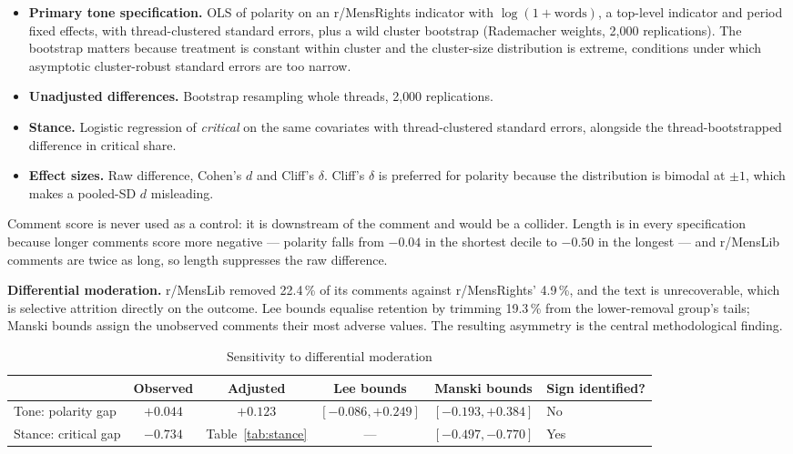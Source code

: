 \documentclass[11pt,a4paper]{article}
\begin{document}
\begin{itemize}
\item \textbf{Primary tone specification.} OLS of polarity on an r/MensRights indicator with
$\log(1+\text{words})$, a top-level indicator and period fixed effects, with thread-clustered
standard errors, plus a wild cluster bootstrap (Rademacher weights, 2{,}000 replications). The
bootstrap matters because treatment is constant within cluster and the cluster-size distribution is
extreme, conditions under which asymptotic cluster-robust standard errors are too narrow.
\item \textbf{Unadjusted differences.} Bootstrap resampling whole threads, 2{,}000 replications.
\item \textbf{Stance.} Logistic regression of \emph{critical} on the same covariates with
thread-clustered standard errors, alongside the thread-bootstrapped difference in critical share.
\item \textbf{Effect sizes.} Raw difference, Cohen's $d$ and Cliff's $\delta$. Cliff's $\delta$ is
preferred for polarity because the distribution is bimodal at $\pm 1$, which makes a pooled-SD $d$
misleading.
\end{itemize}

Comment score is never used as a control: it is downstream of the comment and would be a collider.
Length is in every specification because longer comments score more negative --- polarity falls from
$-0.04$ in the shortest decile to $-0.50$ in the longest --- and r/MensLib comments are twice as
long, so length suppresses the raw difference.

\textbf{Differential moderation.} r/MensLib removed 22.4\,\% of its comments against r/MensRights'
4.9\,\%, and the text is unrecoverable, which is selective attrition directly on the outcome. Lee
bounds equalise retention by trimming 19.3\,\% from the lower-removal group's tails; Manski bounds
assign the unobserved comments their most adverse values. The resulting asymmetry is the central
methodological finding.

\begin{table}[h]
\centering\small
\caption{Sensitivity to differential moderation}\label{tab:bounds}
\begin{tabular}{lccccl}
\toprule
& Observed & Adjusted & Lee bounds & Manski bounds & Sign identified? \\
\midrule
Tone: polarity gap   & $+0.044$ & $+0.123$ & $[-0.086, +0.249]$ & $[-0.193, +0.384]$ & No \\
Stance: critical gap & $-0.734$ & Table~\ref{tab:stance} & ---                & $[-0.497, -0.770]$ & Yes \\
\bottomrule
\end{tabular}
\end{table}
\end{document}
